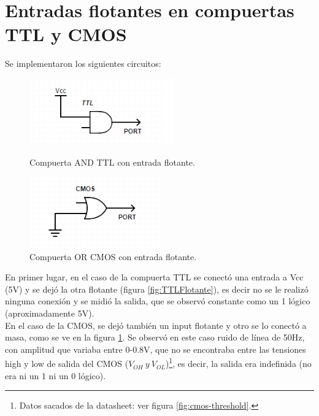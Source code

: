 \section{Entradas flotantes en compuertas TTL y CMOS}
\vspace{5mm}
Se implementaron los siguientes circuitos:

\begin{figure}[H]
    \begin{minipage}{.49\linewidth}
        \centering
        \includegraphics[width=.6\linewidth]{./TTLFlotante.jpg}
        \caption{Compuerta AND TTL con entrada flotante.}
        \label{fig:TTLFlotante}
    \end{minipage}
    \begin{minipage}{.5\linewidth}
        \centering
        \includegraphics[width=.5\linewidth]{./CMOSFlotante.jpg}
        \caption{Compuerta OR CMOS con entrada flotante.}
        \label{fig:CMOSFlotante}
    \end{minipage}
\end{figure}

En primer lugar, en el caso de la compuerta TTL se conectó una entrada a Vcc (5V) y se dejó la otra flotante (figura \ref{fig:TTLFlotante}),
 es decir no se le realizó ninguna conexión y se midió la salida, que se observó constante como un 1 lógico (aproximadamente 5V). \\
En el caso de la CMOS, se dejó también un input flotante y otro se lo conectó a masa, como se ve en la figura \ref{fig:CMOSFlotante}. 
Se observó en este caso ruido de línea de 50Hz, con amplitud que variaba entre 0-0.8V, que no se encontraba entre las tensiones high y low de salida 
del CMOS ($V_{OH}~y~V_{OL}$)\footnote{Datos sacados de la datasheet: ver figura \ref{fig:cmos-threshold}.},
 es decir, la salida era indefinida (no era ni un 1 ni un 0 lógico). 

